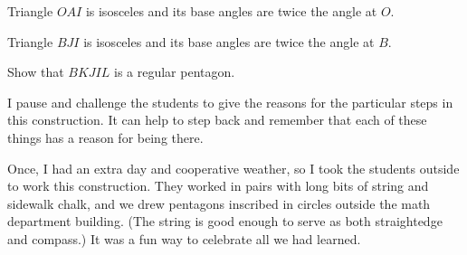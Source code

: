 \begin{conjecture}\label{conj:pentagon-1}
Triangle $OAI$ is isosceles and its base angles are twice the angle at $O$.
\end{conjecture}

\begin{conjecture}\label{conj:pentagon-2}
Triangle $BJI$ is isosceles and its base angles are twice the angle at $B$.
\end{conjecture}

\begin{conjecture}\label{conj:pentagon-3}
Show that $BKJIL$ is a regular pentagon.
\end{conjecture}

\begin{annotation}
{
\color{blue}
I pause and challenge the students to give the reasons for the particular steps in this construction. It can help to step back and remember that each of these things has a reason for being there.

Once, I had an extra day and cooperative weather, so I took the students outside to work this construction. They worked in pairs with long bits of string and sidewalk chalk, and we drew pentagons inscribed in circles outside the math department building. (The string is good enough to serve as both straightedge and compass.) It was a fun way to celebrate all we had learned.
}
\end{annotation}



\backmatter

